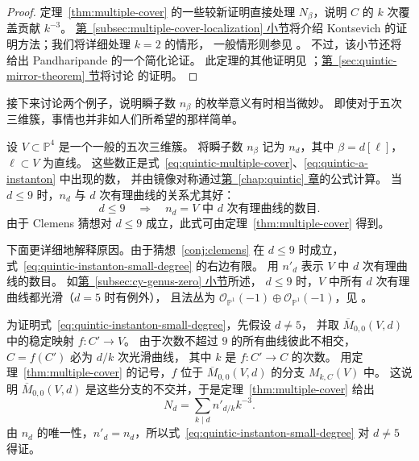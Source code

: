 \begin{proof}
定理~\ref{thm:multiple-cover} 的一些较新证明直接处理 $N_\beta$，说明 $C$ 的 $k$ 次覆盖贡献 $k^{-3}$。
\hyperref[subsec:multiple-cover-localization]{第~\ref*{subsec:multiple-cover-localization} 小节}将介绍 Kontsevich 的证明方法；我们将详细处理 $k=2$ 的情形，
一般情形则参见 。
不过，该小节还将给出 Pandharipande 的一个简化论证。
此定理的其他证明见 ；\hyperref[sec:quintic-mirror-theorem]{第~\ref*{sec:quintic-mirror-theorem} 节}将讨论  的证明。
\end{proof}
接下来讨论两个例子，说明瞬子数 $n_\beta$ 的枚举意义有时相当微妙。
即使对于五次三维簇，事情也并非如人们所希望的那样简单。

\begin{example}\label{ex:quintic-instanton-enumerative}
设 $V\subset\mathbb P^4$ 是一个一般的五次三维簇。
将瞬子数 $n_\beta$ 记为 $n_d$，其中 $\beta=d[\ell]$，$\ell\subset V$ 为直线。
这些数正是式~\eqref{eq:quintic-multiple-cover}、\eqref{eq:quintic-a-instanton} 中出现的数，
并由镜像对称通过\hyperref[chap:quintic]{第~\ref*{chap:quintic} 章}的公式计算。
当 $d\leq9$ 时，$n_d$ 与 $d$ 次有理曲线的关系尤其好：
\begin{equation}\label{eq:quintic-instanton-small-degree}
d\leq9\quad\Longrightarrow\quad n_d=V\text{ 中 }d\text{ 次有理曲线的数目}.
\end{equation}
由于 Clemens 猜想对 $d\leq9$ 成立，此式可由定理~\ref{thm:multiple-cover} 得到。

下面更详细地解释原因。由于猜想~\ref{conj:clemens} 在 $d\leq9$ 时成立，
式~\eqref{eq:quintic-instanton-small-degree} 的右边有限。
用 $n'_d$ 表示 $V$ 中 $d$ 次有理曲线的数目。
如\hyperref[subsec:cy-genus-zero]{第~\ref*{subsec:cy-genus-zero} 小节}所述，
$d\leq9$ 时，$V$ 中所有 $d$ 次有理曲线都光滑（$d=5$ 时有例外），
且法丛为 $\mathcal O_{\mathbb P^1}(-1)\oplus\mathcal O_{\mathbb P^1}(-1)$，见 。

为证明式~\eqref{eq:quintic-instanton-small-degree}，先假设 $d\ne5$，
并取 $\overline M_{0,0}(V,d)$ 中的稳定映射 $f:C'\to V$。
由于次数不超过 $9$ 的所有曲线彼此不相交，$C=f(C')$ 必为 $d/k$ 次光滑曲线，
其中 $k$ 是 $f:C'\to C$ 的次数。
用定理~\ref{thm:multiple-cover} 的记号，$f$ 位于 $\overline M_{0,0}(V,d)$ 的分支 $M_{k,C}(V)$ 中。
这说明 $\overline M_{0,0}(V,d)$ 是这些分支的不交并，于是定理~\ref{thm:multiple-cover} 给出
\[
N_d=\sum_{k\mid d}n'_{d/k}k^{-3}.
\]
由 $n_d$ 的唯一性，$n'_d=n_d$，所以式~\eqref{eq:quintic-instanton-small-degree} 对 $d\ne5$ 得证。


\end{example}
